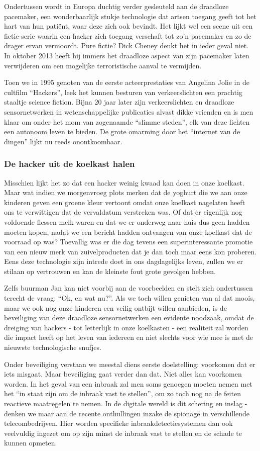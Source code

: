 \documentclass[DIV=calc,paper=a4,fontsize=11pt,twocolumn]{scrartcl}
\newcommand{\heading}[1]{
\vspace{-5mm}
\subsubsection*{#1}
\vspace{-2mm}
}
\begin{document}
Ondertussen wordt in Europa duchtig verder gesleuteld aan de draadloze
pacemaker, een wonderbaarlijk stukje technologie dat artsen toegang geeft tot
het hart van hun pati\"ent, waar deze zich ook bevindt. Het lijkt wel een scene
uit een fictie-serie waarin een hacker zich toegang verschaft tot zo'n
pacemaker en zo de drager ervan vermoordt. Pure fictie? Dick Cheney denkt het
in ieder geval niet. In oktober 2013 heeft hij immers het draadloze aspect van
zijn pacemaker laten verwijderen om een mogelijke terroristische aanval te
vermijden.

Toen we in 1995 genoten van de eerste acteerprestaties van Angelina Jolie in de
cultfilm ``Hackers'', leek het kunnen besturen van verkeerslichten een prachtig
staaltje science fiction. Bijna 20 jaar later zijn verkeerslichten en draadloze
sensornetwerken in wetenschappelijke publicaties alvast dikke vrienden en is
men klaar om onder het mom van zogenaamde ``slimme steden'', elk van deze
lichten een autonoom leven te bieden. De grote omarming door het ``internet van
de dingen'' lijkt nu reeds onontkoombaar.

\heading{De hacker uit de koelkast halen}

Misschien lijkt het zo dat een hacker weinig kwaad kan doen in onze koelkast.
Maar wat indien we morgenvroeg plots merken dat de yoghurt die we aan onze
kinderen geven een groene kleur vertoont omdat onze koelkast nagelaten heeft
ons te verwittigen dat de vervaldatum verstreken was. Of dat er eigenlijk nog
voldoende flessen melk waren en dat we er onderweg naar huis dus geen hadden
moeten kopen, nadat we een bericht hadden ontvangen van onze koelkast dat de
voorraad op was? Toevallig was er die dag tevens een superinteressante promotie
van een nieuw merk van zuivelproducten dat je dan toch maar eens kon proberen.
Eens deze technologie zijn intrede doet in ons dagdagelijks leven, zullen we er
stilaan op vertrouwen en kan de kleinste fout grote gevolgen hebben.

Zelfs buurman Jan kan niet voorbij aan de voorbeelden en stelt zich ondertussen
terecht de vraag: ``Ok, en wat nu?''. Als we toch willen genieten van al dat
moois, maar we ook nog onze kinderen een veilig ontbijt willen aanbieden, is de
beveiliging van deze draadloze sensornetwerken een evidente noodzaak, omdat de
dreiging van hackers - tot letterlijk in onze koelkasten - een realiteit zal
worden die impact heeft op het leven van iedereen en niet slechts voor wie mee
is met de nieuwste technologische snufjes.

Onder beveiliging verstaan we meestal diens eerste doelstelling: voorkomen dat
er iets misgaat. Maar beveiliging gaat verder dan dat. Niet alles kan voorkomen
worden. In het geval van een inbraak zal men soms genoegen moeten nemen met het
``in staat zijn om de inbraak vast te stellen'', om zo toch nog na de feiten
reactieve maatregelen te nemen. In de digitale wereld is dit schering en inslag
- denken we maar aan de recente onthullingen inzake de spionage in
verschillende telecombedrijven. Hier worden specifieke inbraakdetectiesystemen
dan ook veelvuldig ingezet om op zijn minst de inbraak vast te stellen en de
schade te kunnen opmeten.
\end{document}
